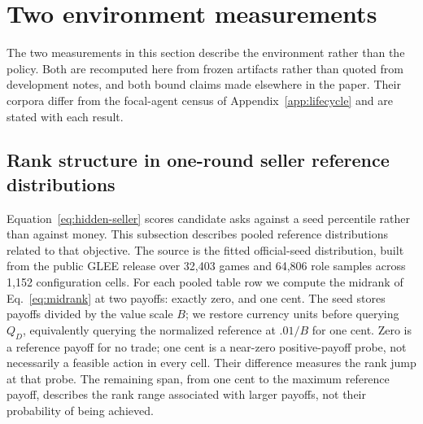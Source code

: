 \section{Two environment measurements}
\label{app:environment}

The two measurements in this section describe the environment rather than the
policy. Both are recomputed here from frozen artifacts rather than quoted from
development notes, and both bound claims made elsewhere in the paper. Their
corpora differ from the focal-agent census of
Appendix~\ref{app:lifecycle} and are stated with each result.

\subsection{Rank structure in one-round seller reference distributions}

Equation~\eqref{eq:hidden-seller} scores candidate asks against a seed
percentile rather than against money. This subsection describes pooled
reference distributions related to that objective. The source is the fitted official-seed
distribution, built from the public GLEE release over 32,403 games and 64,806
role samples across 1,152 configuration cells. For each pooled table row we
compute the midrank of Eq.~\eqref{eq:midrank} at two payoffs: exactly zero, and
one cent. The seed stores payoffs divided by the value scale $B$; we restore
currency units before querying $Q_D$, equivalently querying the normalized
reference at $.01/B$ for one cent. Zero is a reference payoff for no trade; one cent is a near-zero
positive-payoff probe, not necessarily a feasible action in every cell.
Their difference measures the rank jump at that probe. The remaining span,
from one cent to the maximum reference payoff, describes the rank range
associated with larger payoffs, not their probability of being achieved.


